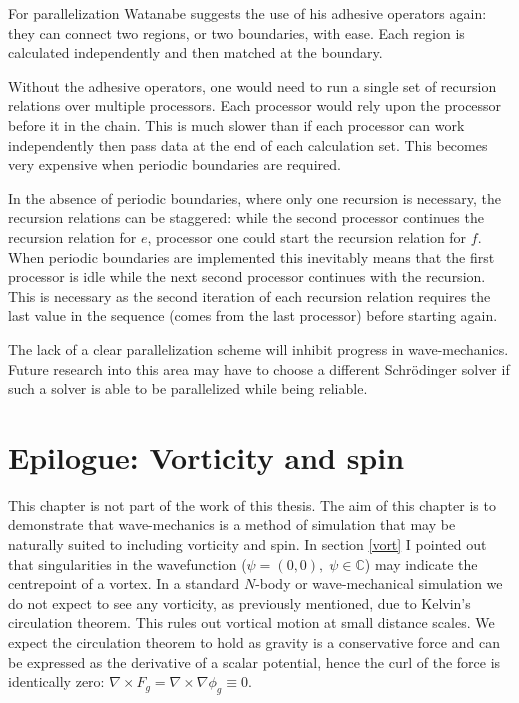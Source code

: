 For parallelization Watanabe suggests the use of his adhesive operators again: they can connect two regions, or two boundaries, with ease. Each region is calculated independently and then matched at the boundary.

Without the adhesive operators, one would need to run a single set of recursion relations over multiple processors. Each processor would rely upon the processor before it in the chain. This is much slower than if each processor can work independently then pass data at the end of each calculation set. This becomes very expensive when periodic boundaries are required.

In the absence of periodic boundaries, where only one recursion is necessary, the recursion relations can be staggered: while the second processor continues the recursion relation for $e$, processor one could start the recursion relation for $f$. When periodic boundaries are implemented this inevitably means that the first processor is idle while the next second processor continues with the recursion. This is necessary as the second iteration of each recursion relation requires the last value in the sequence (comes from the last processor) before starting again.

The lack of a clear parallelization scheme will inhibit progress in wave-mechanics. Future research into this area may have to choose a different Schr\"odinger solver if such a solver is able to be parallelized while being reliable.



%
\chapter{Epilogue: Vorticity and spin}
\label{ch_7}
This chapter is not part of the work of this thesis. The aim of this chapter is to demonstrate that wave-mechanics is a method of simulation that may be naturally suited to including vorticity and spin. In section \ref{vort} I pointed out that singularities in the wavefunction ($\psi = (0,0), \;\psi\in\mathbb{C}$) may indicate the centrepoint of a vortex. In a standard $N$-body or wave-mechanical simulation we do not expect to see any vorticity, as previously mentioned, due to Kelvin's circulation theorem. This rules out vortical motion at small distance scales. We expect the circulation theorem to hold as gravity is a conservative force and can be expressed as the derivative of a scalar potential, hence the curl of the force is identically zero: $\nabla\times F_g = \nabla\times\nabla\phi_g \equiv 0$.

